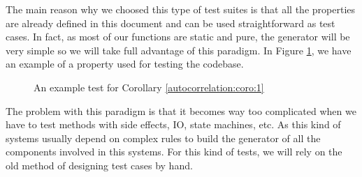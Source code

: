     The main reason why we choosed this type of test suites is that all the
    properties are already defined in this document and can be used
    straightforward as test cases. In fact, as most of our functions
    are static and pure, the generator will be very simple so we will take full
    advantage of this paradigm. In Figure \ref{test_example}, we have an example
    of a property used for testing the codebase.\\

    \begin{figure}[ht!]
      \caption{An example test for Corollary \ref{autocorrelation:coro:1}}
      \label{test_example}
    \end{figure}

    The problem with this paradigm is that it becomes way too complicated when
    we have to test methods with side effects, IO, state machines, etc. As this
    kind of systems usually depend on complex rules to build the generator of
    all the components involved in this systems. For this kind of tests, we
    will rely on the old method of designing test cases by hand.\\

